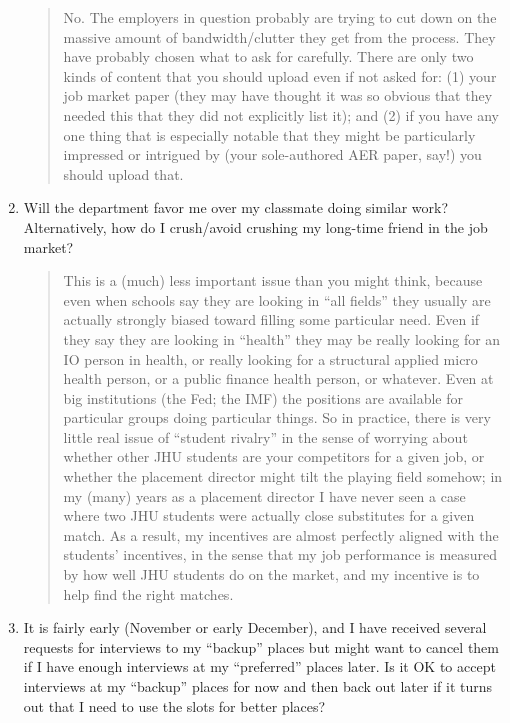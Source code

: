 \documentclass{\classes/econtex}
\begin{document}
\begin{enumerate}
  \begin{quote}
    No. The employers in question probably are trying to cut down on the massive amount of bandwidth/clutter they get from the process.  They have probably chosen what to ask for carefully.  There are only two kinds of content that you should upload even if not asked for: (1) your job market paper (they may have thought it was so obvious that they needed this that they did not explicitly list it); and (2) if you have any one thing that is especially notable that they might be particularly impressed or intrigued by (your sole-authored AER paper, say!) you should upload that.

  \end{quote}
\item  Will the department favor me over my classmate doing similar work?  Alternatively, how do I crush/avoid crushing my long-time friend in the job market?

  \begin{quote}
    This is a (much) less important issue than you might think, because even when schools say they are looking in ``all fields'' they usually are actually strongly biased toward filling some particular need.  Even if they say they are looking in ``health'' they may be really looking for an IO person in health, or really looking for a structural applied micro health person, or a public finance health person, or whatever.  Even at big institutions (the Fed; the IMF) the positions are available for particular groups doing particular things.  So in practice, there is very little real issue of ``student rivalry'' in the sense of worrying about whether other JHU students are your competitors for a given job, or whether the placement director might tilt the playing field somehow; in my (many) years as a placement director I have never seen a case where two JHU students were actually close substitutes for a given match.  As a result, my incentives are almost perfectly aligned with the students' incentives, in the sense that my job performance is measured by how well JHU students do on the market, and my incentive is to help find the right matches.

  \end{quote}

\item  It is fairly early (November or early December), and I have received several requests for interviews to my ``backup'' places but might want to cancel them if I have enough interviews at my ``preferred'' places later.  Is it OK to accept interviews at my ``backup'' places for now and then back out later if it turns out that I need to use the slots for better places?


\end{enumerate}
\end{document}
